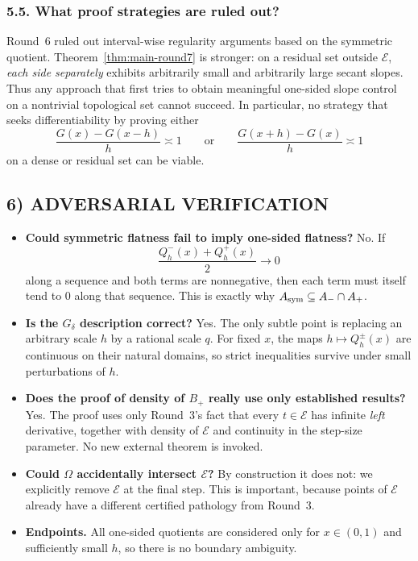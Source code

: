 \subsubsection*{5.5. What proof strategies are ruled out?}

Round~6 ruled out interval-wise regularity arguments based on the symmetric quotient.
Theorem~\ref{thm:main-round7} is stronger: on a residual set outside $\mathcal E$, \emph{each side separately} exhibits arbitrarily small and arbitrarily large secant slopes.
Thus any approach that first tries to obtain meaningful one-sided slope control on a nontrivial topological set cannot succeed.
In particular, no strategy that seeks differentiability by proving either
\[
\frac{G(x)-G(x-h)}{h}\asymp 1
\qquad\text{or}\qquad
\frac{G(x+h)-G(x)}{h}\asymp 1
\]
on a dense or residual set can be viable.

\subsection{6) ADVERSARIAL VERIFICATION}

\begin{itemize}
\item \textbf{Could symmetric flatness fail to imply one-sided flatness?}
No. If
\[
\frac{Q_h^-(x)+Q_h^+(x)}{2}\to0
\]
along a sequence and both terms are nonnegative, then each term must itself tend to $0$ along that sequence.
This is exactly why $A_{\rm sym}\subseteq A_-\cap A_+$.

\item \textbf{Is the $G_\delta$ description correct?}
Yes. The only subtle point is replacing an arbitrary scale $h$ by a rational scale $q$.
For fixed $x$, the maps $h\mapsto Q_h^\pm(x)$ are continuous on their natural domains, so strict inequalities survive under small perturbations of $h$.

\item \textbf{Does the proof of density of $B_+$ really use only established results?}
Yes. The proof uses only Round~3's fact that every $t\in\mathcal E$ has infinite \emph{left} derivative, together with density of $\mathcal E$ and continuity in the step-size parameter.
No new external theorem is invoked.

\item \textbf{Could $\Omega$ accidentally intersect $\mathcal E$?}
By construction it does not: we explicitly remove $\mathcal E$ at the final step.
This is important, because points of $\mathcal E$ already have a different certified pathology from Round~3.

\item \textbf{Endpoints.}
All one-sided quotients are considered only for $x\in(0,1)$ and sufficiently small $h$, so there is no boundary ambiguity.
\end{itemize}

